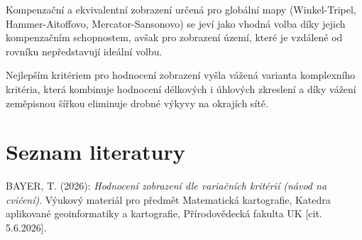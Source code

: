 \documentclass[12pt, a4paper]{article}
\begin{document}
\noindent Kompenzační a ekvivalentní zobrazení určená pro globální mapy (Winkel-Tripel, Hammer-Aitoffovo, Mercator-Sansonovo) se jeví jako vhodná volba díky jejich kompenzačním schopnostem, avšak pro zobrazení území, které je vzdálené od rovníku nepředstavují ideální volbu.
\vspace{3mm}

\noindent Nejlepším kritériem pro hodnocení zobrazení vyšla vážená varianta komplexního kritéria, která kombinuje hodnocení délkových i úhlových zkreslení a díky vážení zeměpisnou šířkou eliminuje drobné výkyvy na okrajích sítě.

\newpage
\section{Seznam literatury}
\vspace{3mm}

BAYER, T. (2026): \textit{Hodnocení zobrazení dle variačních kritérií (návod na cvičení)}. Výukový materiál pro předmět Matematická kartografie, Katedra aplikované geoinformatiky a kartografie, Přírodovědecká fakulta UK [cit. 5.6.2026].
\end{document}

